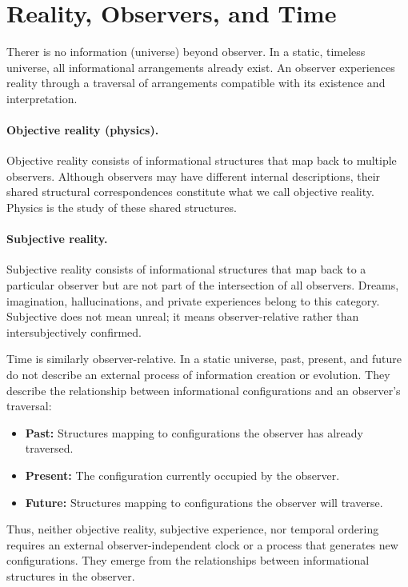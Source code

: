 \section{Reality, Observers, and Time}

Therer is no information (universe) beyond observer.
In a static, timeless universe, all informational arrangements
already exist. An observer experiences reality through a traversal
of arrangements compatible with its existence and interpretation.


\paragraph{Objective reality (physics).}
Objective reality consists of informational structures that map
back to multiple observers. Although observers may have different
internal descriptions, their shared structural correspondences
constitute what we call objective reality. Physics is the study
of these shared structures.


\paragraph{Subjective reality.}
Subjective reality consists of informational structures that map
back to a particular observer but are not part of the intersection
of all observers. Dreams, imagination, hallucinations, and private
experiences belong to this category. Subjective does not mean
unreal; it means observer-relative rather than intersubjectively
confirmed.

Time is similarly observer-relative. In a static universe, past,
present, and future do not describe an external process of
information creation or evolution. They describe the relationship
between informational configurations and an observer's traversal:

\begin{itemize}
    \item \textbf{Past:} Structures mapping to configurations the
    observer has already traversed.

    \item \textbf{Present:} The configuration currently occupied
    by the observer.

    \item \textbf{Future:} Structures mapping to configurations
    the observer will traverse.
\end{itemize}

Thus, neither objective reality, subjective experience, nor
temporal ordering requires an external observer-independent
clock or a process that generates new configurations. They emerge
from the relationships between informational structures in the 
observer.

